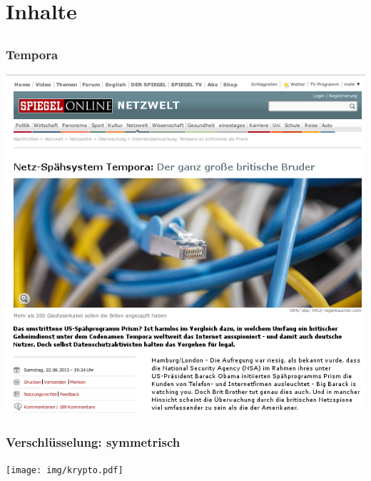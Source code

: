 \documentclass[12pt]{beamer}
\begin{document}
\section{Inhalte}
\subsection{}

\begin{frame}
    \frametitle{Tempora}
    \includegraphics[height=0.7\textheight]{img/spiegel-tempora.png}
\end{frame}

\begin{frame}
    \frametitle{Verschlüsselung: symmetrisch}
    \begin{center}
	\texttt{[image: img/krypto.pdf]}
    \end{center}	
\end{frame}
\end{document}
